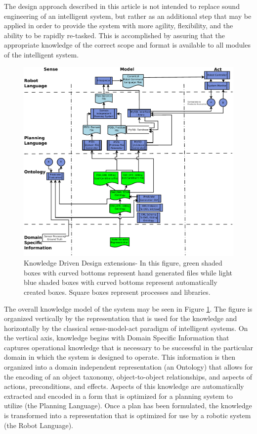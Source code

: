 The design approach described in this article is not intended to
replace sound engineering of an intelligent system, but rather as
an additional step that may be applied in order to provide
the system with more agility, flexibility, and the ability to be rapidly
re-tasked. This is accomplished by assuring that the appropriate knowledge
of the correct scope and format is available to all modules of the
intelligent system.

\begin{figure}[ht!]
\begin{center}
\includegraphics[width=13cm]{images/KnowledgeDrivenRobotics.pdf}
\caption{Knowledge Driven Design extensions- In this figure, green shaded boxes with curved bottoms
represent hand generated files while
light blue shaded boxes with curved bottoms represent automatically created boxes. Square
boxes represent processes and libraries.}
\label{fig:DesignArchitecture}
\end{center}
\end{figure}

The overall knowledge model of the system may be seen in Figure \ref{fig:DesignArchitecture}.
The figure is organized vertically by the representation that is used for the knowledge
and horizontally by the classical sense-model-act paradigm of intelligent systems.
On the vertical axis, knowledge begins with Domain Specific Information that captures
operational knowledge that is necessary to be successful in the particular domain in which
the system is designed to operate. This information is then organized into a domain
independent representation (an Ontology) that allows for the encoding of an object
taxonomy, object-to-object
relationships, and aspects of actions, preconditions, and effects.
Aspects of this
knowledge are automatically extracted and encoded in a form that is optimized for
a planning system to utilize (the Planning Language). Once a plan has been formulated,
the knowledge is transformed into a representation that is optimized for use by a robotic system
(the Robot Language).

